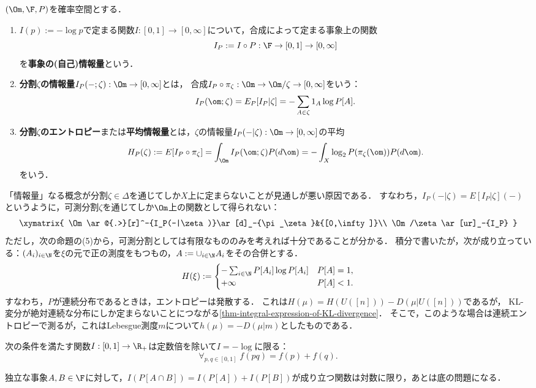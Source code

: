\documentclass[uplatex,dvipdfmx]{jsreport}
\begin{document}
\begin{definition}
    $(\Om,\F,P)$を確率空間とする．
    \begin{enumerate}
        \item $I(p):=-\log p$で定まる関数$I:[0,1]\to[0,\infty]$について，合成によって定まる事象上の関数\[I_P:=I\circ P:\F\to[0,1]\to[0,\infty]\]を\textbf{事象の(自己)情報量}という．
        \item \textbf{分割$\zeta$の情報量}$I_P(-;\zeta):\Om\to[0,\infty]$とは，
        合成$I_P\circ\pi_\zeta:\Om\to \Om/\zeta\to[0,\infty]$をいう：
        \[I_P(\om;\zeta)=E_P[I_P|\zeta]=-\sum_{A\in\zeta}1_A\log P[A].\]
        \item \textbf{分割$\zeta$のエントロピー}または\textbf{平均情報量}とは，$\zeta$の情報量$I_P(-|\zeta):\Om\to[0,\infty]$の平均
        \[H_P(\zeta):= E[I_P\circ\pi_\zeta]=\int_\Om I_P(\om;\zeta) P(d\om)=-\int_X\log_2 P(\pi_\zeta(\om))P(d\om).\]
        をいう．
    \end{enumerate}
\end{definition}
\begin{remarks}
    「情報量」なる概念が分割$\zeta\in\Delta$を通じてしか$X$上に定まらないことが見通しが悪い原因である．
    すなわち，$I_P(-|\zeta)=E[I_P|\zeta](-)$というように，可測分割$\zeta$を通じてしか$\Om$上の関数として得られない：
    \[\xymatrix{
        \Om\ar@{.>}[r]^-{I_P(-|\zeta)}\ar[d]_-{\pi_\zeta}&{[0,\infty]}\\
        \Om/\zeta\ar[ur]_-{I_P}
    }\]
    ただし，次の命題の(5)から，可測分割としては有限なもののみを考えれば十分であることが分かる．
    積分で書いたが，次が成り立っている：$(A_i)_{i\in\N}$を$\xi$の元で正の測度をもつもの，$A:=\cup_{i\in\N}A_i$をその合併とする．
    \[H(\xi):=\begin{cases}
        -\sum_{i\in\N}P[A_i]\log P[A_i]&P[A]=1,\\
        +\infty&P[A]<1.
    \end{cases}\]
    すなわち，$P$が連続分布であるときは，エントロピーは発散する．
    これは$H(\mu)=H(U([n]))-D(\mu|U([n]))$であるが，
    KL-変分が絶対連続な分布にしか定まらないことにつながる\ref{thm-integral-expression-of-KL-divergence}．
    そこで，このような場合は連続エントロピーで測るが，これはLebesgue測度$m$について$h(\mu)=-D(\mu|m)$としたものである．
\end{remarks}

\begin{proposition}[対数関数の特徴付け]
    次の条件を満たす関数$I:[0,1]\to\R_+$は定数倍を除いて$I=-\log$に限る：
    \[\forall_{p,q\in[0,1]}\;f(pq)=f(p)+f(q).\]
\end{proposition}
\begin{remarks}
    独立な事象$A,B\in\F$に対して，$I(P[A\cap B])=I(P[A])+I(P[B])$が成り立つ関数は対数に限り，あとは底の問題になる．
\end{remarks}
\end{document}
